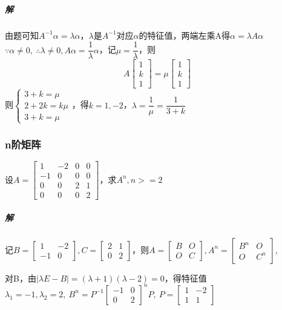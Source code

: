 \subparagraph{解}
由题可知\(A^{-1}\alpha = \lambda\alpha\)，\(\lambda\)是\(A^{-1}\)对应\(\alpha\)的特征值，两端左乘A得\(\alpha = \lambda A\alpha\)
\(\because \alpha \neq 0,\ \therefore \lambda \neq 0, A\alpha = \dfrac{1}{\lambda}\alpha\)，记\(\mu = \dfrac{1}{\lambda}\)，则
\[A\begin{bmatrix}
    1 \\ 
    k \\ 
    1
\end{bmatrix} = \mu\begin{bmatrix}
    1 \\ 
    k \\ 
    1
\end{bmatrix}\]
则\(\begin{cases}
    3 + k = \mu \\ 
    2 + 2k = k\mu \\ 
    3 + k = \mu
\end{cases}\)，得\(k = 1, -2\)，\(\lambda = \dfrac{1}{\mu} = \dfrac{1}{3 + k}\)

\subsubsection{n阶矩阵}
设\(A = \begin{bmatrix}
    1 & -2 & 0 & 0 \\ 
    -1 & 0 & 0 & 0 \\ 
    0 & 0 & 2 & 1 \\ 
    0 & 0 & 0 & 2
\end{bmatrix}\)，求\(A^n, n >= 2\)

\subparagraph{解}
记\(B = \begin{bmatrix}
    1 & -2 \\ 
    -1 & 0
\end{bmatrix}, C = \begin{bmatrix}
    2 & 1 \\ 
    0 & 2
\end{bmatrix}\)，则\(A = \begin{bmatrix}
    B & O \\ 
    O & C
\end{bmatrix}, A^n = \begin{bmatrix}
    B^n & O \\ 
    O & C^n
\end{bmatrix}\),

对B，由\(|\lambda E - B| = (\lambda + 1)(\lambda - 2) = 0\)，得特征值\(\lambda_1 = -1, \lambda_2 = 2,\ B^n = P^{-1}\begin{bmatrix}
    -1 & 0 \\ 
    0 & 2
\end{bmatrix}^nP,\ P = \begin{bmatrix}
    1 & -2 \\ 
    1 & 1
\end{bmatrix}\)

